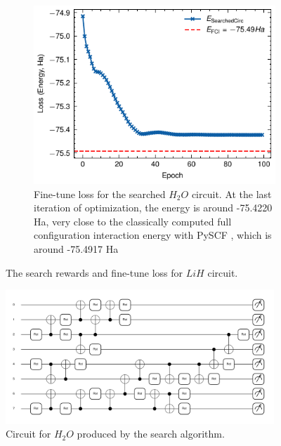 \documentclass[a4paper,onecolumn,11pt]{quantumarticle}
\begin{document}
\begin{figure}[H]
\begin{subfigure}[t]{0.48\textwidth}
        \includegraphics[width=\textwidth]{Figures/fig_H2O_fine_tune_loss.pdf}
        \caption{Fine-tune loss for the searched $H_2 O$ circuit. At the last iteration of optimization, the energy is around -75.4220  Ha, very close to the classically computed full configuration interaction energy with PySCF \cite{Sun2018-nq, Sun2020-ej}, which is around -75.4917  Ha}
        \label{fig:h2o_finetune}
    \end{subfigure}
    \caption{The search rewards and fine-tune loss for $LiH$ circuit.}\label{fig:h2o_search_finetune}
\end{figure}

\begin{figure}[H]
  \centering
  \includegraphics[width=0.9\textwidth]{Figures/fig_h2o_circ.pdf}
  \caption{Circuit for $H_2 O$ produced by the search algorithm.}
  \label{fig:h2o_circ}
\end{figure}
\end{document}
